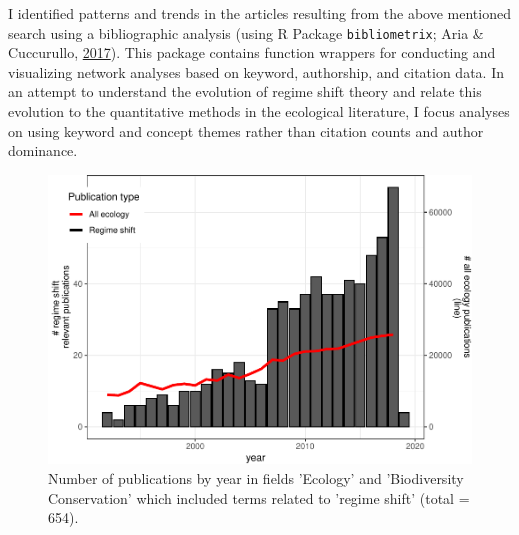 \documentclass[print]{nuthesis}
\begin{document}
I identified patterns and trends in the articles resulting from the above mentioned search using a bibliographic analysis (using R Package \texttt{bibliometrix}; Aria \& Cuccurullo, \protect\hyperlink{ref-bibliometrix}{2017}). This package contains function wrappers for conducting and visualizing network analyses based on keyword, authorship, and citation data. In an attempt to understand the evolution of regime shift theory and relate this evolution to the quantitative methods in the ecological literature, I focus analyses on using keyword and concept themes rather than citation counts and author dominance.
\begin{figure}
\includegraphics[width=0.85\linewidth]{_myDissertation_files/figure-latex/wosRegimePubsByYearwithNumEcolPubs-1} \caption{Number of publications by year in fields 'Ecology' and 'Biodiversity Conservation' which included terms related to 'regime shift' (total = 654).}\label{fig:wosRegimePubsByYearwithNumEcolPubs}
\end{figure}
\end{document}
